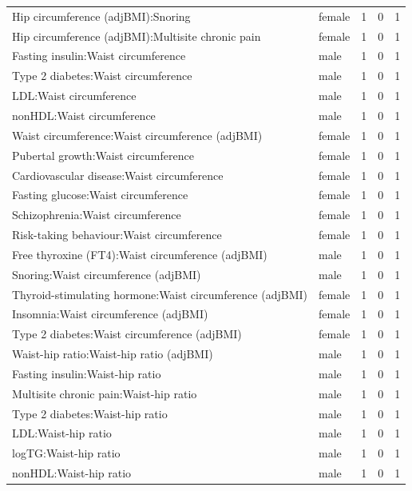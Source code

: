 \begin{table}[ht]
\begin{tabular}{llrrr}
  Hip circumference (adjBMI):Snoring & female &   1 &   0 &   1 \\ 
  Hip circumference (adjBMI):Multisite chronic pain & female &   1 &   0 &   1 \\ 
  Fasting insulin:Waist circumference & male &   1 &   0 &   1 \\ 
  Type 2 diabetes:Waist circumference & male &   1 &   0 &   1 \\ 
  LDL:Waist circumference & male &   1 &   0 &   1 \\ 
  nonHDL:Waist circumference & male &   1 &   0 &   1 \\ 
  Waist circumference:Waist circumference (adjBMI) & female &   1 &   0 &   1 \\ 
  Pubertal growth:Waist circumference & female &   1 &   0 &   1 \\ 
  Cardiovascular disease:Waist circumference & female &   1 &   0 &   1 \\ 
  Fasting glucose:Waist circumference & female &   1 &   0 &   1 \\ 
  Schizophrenia:Waist circumference & female &   1 &   0 &   1 \\ 
  Risk-taking behaviour:Waist circumference & female &   1 &   0 &   1 \\ 
  Free thyroxine (FT4):Waist circumference (adjBMI) & male &   1 &   0 &   1 \\ 
  Snoring:Waist circumference (adjBMI) & male &   1 &   0 &   1 \\ 
  Thyroid-stimulating hormone:Waist circumference (adjBMI) & female &   1 &   0 &   1 \\ 
  Insomnia:Waist circumference (adjBMI) & female &   1 &   0 &   1 \\ 
  Type 2 diabetes:Waist circumference (adjBMI) & female &   1 &   0 &   1 \\ 
  Waist-hip ratio:Waist-hip ratio (adjBMI) & male &   1 &   0 &   1 \\ 
  Fasting insulin:Waist-hip ratio & male &   1 &   0 &   1 \\ 
  Multisite chronic pain:Waist-hip ratio & male &   1 &   0 &   1 \\ 
  Type 2 diabetes:Waist-hip ratio & male &   1 &   0 &   1 \\ 
  LDL:Waist-hip ratio & male &   1 &   0 &   1 \\ 
  logTG:Waist-hip ratio & male &   1 &   0 &   1 \\ 
  nonHDL:Waist-hip ratio & male &   1 &   0 &   1 \\ 

\end{tabular}
\end{table}
